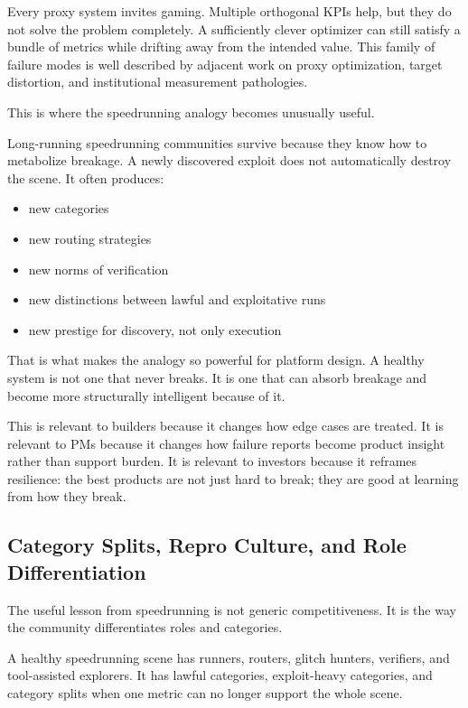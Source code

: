\documentclass[11pt]{article}
\begin{document}
Every proxy system invites gaming. Multiple orthogonal KPIs help, but they do not solve the problem completely. A sufficiently clever optimizer can still satisfy a bundle of metrics while drifting away from the intended value. This family of failure modes is well described by adjacent work on proxy optimization, target distortion, and institutional measurement pathologies.

This is where the speedrunning analogy becomes unusually useful.

Long-running speedrunning communities survive because they know how to metabolize breakage. A newly discovered exploit does not automatically destroy the scene. It often produces:

\begin{itemize}
  \item new categories
  \item new routing strategies
  \item new norms of verification
  \item new distinctions between lawful and exploitative runs
  \item new prestige for discovery, not only execution
\end{itemize}

That is what makes the analogy so powerful for platform design. A healthy system is not one that never breaks. It is one that can absorb breakage and become more structurally intelligent because of it.

This is relevant to builders because it changes how edge cases are treated. It is relevant to PMs because it changes how failure reports become product insight rather than support burden. It is relevant to investors because it reframes resilience: the best products are not just hard to break; they are good at learning from how they break.

\subsection{Category Splits, Repro Culture, and Role Differentiation}

The useful lesson from speedrunning is not generic competitiveness. It is the way the community differentiates roles and categories.

A healthy speedrunning scene has runners, routers, glitch hunters, verifiers, and tool-assisted explorers. It has lawful categories, exploit-heavy categories, and category splits when one metric can no longer support the whole scene.
\end{document}
